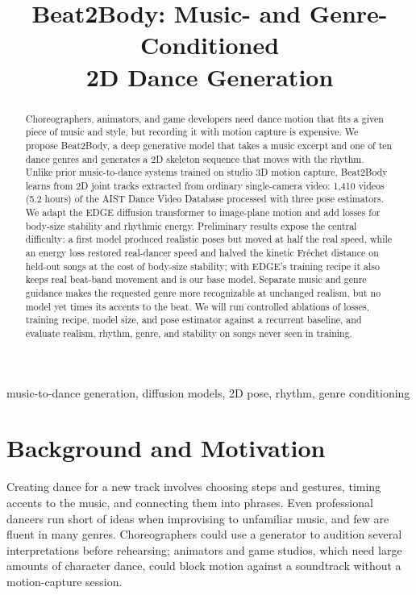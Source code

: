\documentclass[conference,letterpaper]{IEEEtran}
\title{Beat2Body: Music- and Genre-Conditioned\\2D Dance Generation}
\author{\IEEEauthorblockN{YinHsuan Hsu, Yi Xin, and Sizhe Zhang}
\IEEEauthorblockA{ELEC/COMP 576 -- Introduction to Deep Learning\\
Final Project Proposal $\cdot$ November 19, 2026}}
\begin{document}
\maketitle

\begin{abstract}
Choreographers, animators, and game developers need dance motion that fits a given piece of music and style, but recording it with motion capture is expensive. We propose Beat2Body, a deep generative model that takes a music excerpt and one of ten dance genres and generates a 2D skeleton sequence that moves with the rhythm. Unlike prior music-to-dance systems trained on studio 3D motion capture, Beat2Body learns from 2D joint tracks extracted from ordinary single-camera video: 1,410 videos (5.2 hours) of the AIST Dance Video Database processed with three pose estimators. We adapt the EDGE diffusion transformer to image-plane motion and add losses for body-size stability and rhythmic energy. Preliminary results expose the central difficulty: a first model produced realistic poses but moved at half the real speed, while an energy loss restored real-dancer speed and halved the kinetic Fr\'echet distance on held-out songs at the cost of body-size stability; with EDGE's training recipe it also keeps real beat-band movement and is our base model. Separate music and genre guidance makes the requested genre more recognizable at unchanged realism, but no model yet times its accents to the beat. We will run controlled ablations of losses, training recipe, model size, and pose estimator against a recurrent baseline, and evaluate realism, rhythm, genre, and stability on songs never seen in training.
\end{abstract}

\begin{IEEEkeywords}
music-to-dance generation, diffusion models, 2D pose, rhythm, genre conditioning
\end{IEEEkeywords}

\section{Background and Motivation}
Creating dance for a new track involves choosing steps and gestures, timing accents to the music, and connecting them into phrases. Even professional dancers run short of ideas when improvising to unfamiliar music, and few are fluent in many genres. Choreographers could use a generator to audition several interpretations before rehearsing; animators and game studios, which need large amounts of character dance, could block motion against a soundtrack without a motion-capture session.
\end{document}
